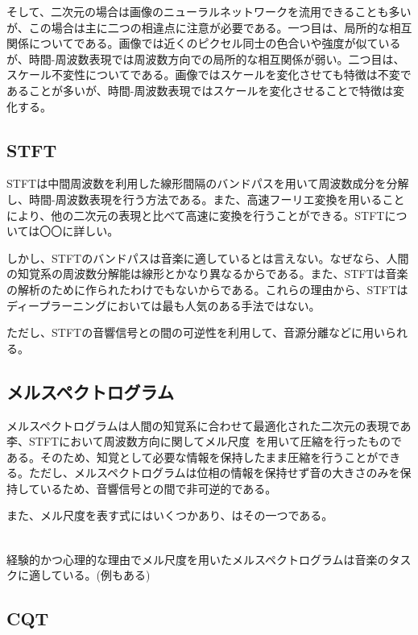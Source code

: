 そして、二次元の場合は画像のニューラルネットワークを流用できることも多いが、この場合は主に二つの相違点に注意が必要である。一つ目は、局所的な相互関係についてである。画像では近くのピクセル同士の色合いや強度が似ているが、時間-周波数表現では周波数方向での局所的な相互関係が弱い。二つ目は、スケール不変性についてである。画像ではスケールを変化させても特徴は不変であることが多いが、時間-周波数表現ではスケールを変化させることで特徴は変化する。

\clearpage

\subsection{STFT}

STFTは中間周波数を利用した線形間隔のバンドパスを用いて周波数成分を分解し、時間-周波数表現を行う方法である。また、高速フーリエ変換を用いることにより、他の二次元の表現と比べて高速に変換を行うことができる。STFTについては〇〇に詳しい。

しかし、STFTのバンドパスは音楽に適しているとは言えない。なぜなら、人間の知覚系の周波数分解能は線形とかなり異なるからである。また、STFTは音楽の解析のために作られたわけでもないからである。これらの理由から、STFTはディープラーニングにおいては最も人気のある手法ではない。

ただし、STFTの音響信号との間の可逆性を利用して、音源分離などに用いられる。

\subsection{メルスペクトログラム}

メルスペクトログラムは人間の知覚系に合わせて最適化された二次元の表現であ李、STFTにおいて周波数方向に関してメル尺度~\cite{melscale}を用いて圧縮を行ったものである。そのため、知覚として必要な情報を保持したまま圧縮を行うことができる。ただし、メルスペクトログラムは位相の情報を保持せず音の大きさのみを保持しているため、音響信号との間で非可逆的である。

また、メル尺度を表す式にはいくつかあり、はその一つである。

\begin{align}
    \label{eq:mel}
\end{align}

経験的かつ心理的な理由でメル尺度を用いたメルスペクトログラムは音楽のタスクに適している。(例もある)

\subsection{CQT}

